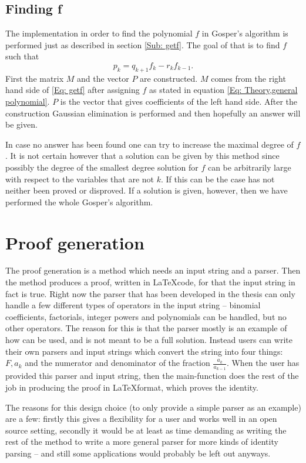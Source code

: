 \subsection{Finding f}
The implementation in order to find the polynomial $f$ in Gosper's algorithm is performed just as described in section \ref{Sub: getf}. The goal of that is to find $f$ such that
\begin{equation}\label{Eq: getf}
  p_k=q_{k+1}f_k-r_kf_{k-1}.
\end{equation}
First the matrix $M$ and the vector $P$ are constructed. $M$ comes from the right hand side of \ref{Eq: getf} after assigning $f$ as stated in equation \ref{Eq: Theory,general polynomial}. $P$ is the vector that gives coefficients of the left hand side. After the construction Gaussian elimination is performed and then hopefully an answer will be given.

In case no answer has been found one can try to increase the maximal degree of $f$. It is not certain however that a solution can be given by this method since possibly the degree of the smallest degree solution for $f$ can be arbitrarily large with respect to the variables that are not $k$. If this can be the case has not neither been proved or disproved. If a solution is given, however, then we have performed the whole Gosper's algorithm.
\section{Proof generation}
The proof generation is a method which needs an input string and a parser. Then the method produces a proof, written in \LaTeX code, for that the input string in fact is true. Right now the parser that has been developed in the thesis can only handle a few different types of operators in the input string -- binomial coefficients, factorials, integer powers and polynomials can be handled, but no other operators. The reason for this is that the parser mostly is an example of how \WZ can be used, and is not meant to be a full solution. Instead users can write their own parsers and input strings which convert the string into four things: $F,a_k$ and the numerator and denominator of the fraction $\frac{a_k}{a_{k-1}}$. When the user has provided this parser and input string, then the main-function does the rest of the job in producing the proof in \LaTeX format, which proves the identity.

The reasons for this design choice (to only provide a simple parser as an example) are a few: firstly this gives a flexibility for a user and works well in an open source setting, secondly it would be at least as time demanding as writing the rest of the method to write a more general parser for more kinds of identity parsing -- and still some applications would probably be left out anyways.

